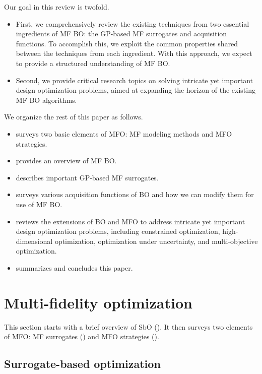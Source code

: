 \documentclass[journal ]{new-aiaa}
\begin{document}
Our goal in this review is twofold.
\begin{itemize}
	\item First, we comprehensively review the existing techniques from two essential ingredients of MF BO: the GP-based MF surrogates and acquisition functions.
	To accomplish this, we exploit the common properties shared between the techniques from each ingredient.
	With this approach, we expect to provide a structured understanding of MF BO.
	
	\item Second, we provide critical research topics on solving intricate yet important design optimization problems, aimed at expanding the horizon of the existing MF BO algorithms.	
\end{itemize} 

We organize the rest of this paper as follows.
\begin{itemize}
	\item {} surveys two basic elements of MFO: MF modeling methods and MFO strategies.

	\item {} provides an overview of MF BO.
	
	\item {} describes important GP-based MF surrogates.
	
	\item {} surveys various acquisition functions of BO and how we can modify them for use of MF BO.
	
	\item {} reviews the extensions of BO and MFO to address intricate yet important design optimization problems, including constrained optimization, high-dimensional optimization, optimization under uncertainty, and multi-objective optimization.
	
	\item {} summarizes and concludes this paper.
\end{itemize} 

\section{Multi-fidelity optimization}\label{Sec2}

This section starts with a brief overview of SbO ().
It then surveys two elements of MFO: MF surrogates () and MFO strategies ().

\subsection{Surrogate-based optimization}\label{Sec21}
\end{document}
